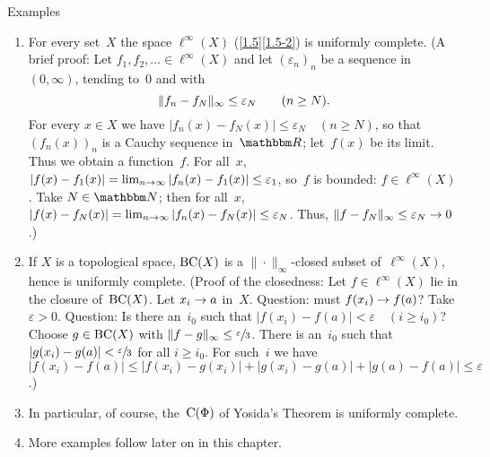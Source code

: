 \documentclass[main.tex]{subfiles}
\begin{document}
\begin{psec}{4.6}{Examples}
\begin{enumerate}
\item \label{4.6-1}
For every set~$X$
the space $\ell^\infty(X)$ (\ref{1.5}\ref{1.5-2})
is uniformly complete.
(A brief proof:
Let $f_1,f_2,\dotsc\in \ell^\infty(X)$
and let $(\varepsilon_n)_n$ be a sequence in~$(0,\infty)$,
tending to~$0$ and with
\begin{equation*}
\|f_n-f_N\|_\infty \leq \varepsilon_N \qquad (n\geq N)\text{.}
\end{equation*}
For every $x\in X$ we have $|f_n(x)-f_N(x)|\leq\varepsilon_N\quad (n\geq N)$,
so that $(f_n(x))_n$ is a Cauchy sequence in~$\R$;
let~$f(x)$ be its limit.
Thus we obtain a function~$f$.
For all~$x$,
$|f(x)-f_1(x)|=\lim_{n\rightarrow \infty} |f_n(x)-f_1(x)|\leq \varepsilon_1$,
so~$f$ is bounded: $f\in \ell^\infty(X)$.
Take $N\in\N$;
then for all~$x$,
$|f(x)-f_N(x)|
=\lim_{n\rightarrow\infty}|f_n(x)-f_N(x)|
\leq\varepsilon_N$.
Thus, $\| f-f_N \|_\infty \leq \varepsilon_N \rightarrow 0$.)
%
\item \label{4.6-2}
If $X$ is a topological space,
$\mathrm{BC}(X)$ is a $\|\cdot\|_\infty$-closed subset of~$\ell^\infty(X)$,
hence is uniformly complete.
(Proof of the closedness:
Let $f\in \ell^\infty(X)$ lie in the closure of~$\mathrm{BC}(X)$.
Let $x_i\rightarrow a$ in~$X$.
Question:
must $f(x_i)\rightarrow f(a)$?
Take $\varepsilon>0$.
Question:
Is there an~$i_0$
such that $|f(x_i)-f(a)|<\varepsilon\quad(i\geq i_0)$?
Choose $g\in\mathrm{BC}(X)$ 
with $\|f-g\|_\infty\leq \sfrac{\varepsilon}{3}$.
There is an~$i_0$ such that $|g(x_i)-g(a)|<\sfrac{\varepsilon}{3}$
for all $i\geq i_0$.
For such~$i$ we have
$|f(x_i)-f(a)|
\leq|f(x_i)-g(x_i)| + |g(x_i)-g(a)| + |g(a)-f(a)|
\leq \varepsilon$.)
%
\item \label{4.6-3}
In particular,
of course,
the~$\mathrm{C}(\Phi)$ of Yosida's Theorem is uniformly complete.
%
\item \label{4.6-4}
More examples follow later on in this chapter.
\end{enumerate}
\end{psec}
\clearpage
\end{document}
